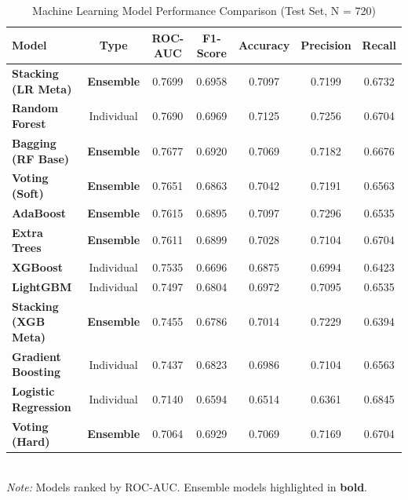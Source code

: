 \begin{table}[htbp]
\centering
\caption{Machine Learning Model Performance Comparison (Test Set, N = 720)}
\label{tab:model-comparison}
\begin{tabular}{lcccccc}
\toprule
\textbf{Model} & \textbf{Type} & \textbf{ROC-AUC} & \textbf{F1-Score} & \textbf{Accuracy} & \textbf{Precision} & \textbf{Recall} \\
\midrule
\textbf{Stacking (LR Meta)} & \textbf{Ensemble} & 0.7699 & 0.6958 & 0.7097 & 0.7199 & 0.6732 \\
\textbf{Random Forest} & Individual & 0.7690 & 0.6969 & 0.7125 & 0.7256 & 0.6704 \\
\textbf{Bagging (RF Base)} & \textbf{Ensemble} & 0.7677 & 0.6920 & 0.7069 & 0.7182 & 0.6676 \\
\textbf{Voting (Soft)} & \textbf{Ensemble} & 0.7651 & 0.6863 & 0.7042 & 0.7191 & 0.6563 \\
\textbf{AdaBoost} & \textbf{Ensemble} & 0.7615 & 0.6895 & 0.7097 & 0.7296 & 0.6535 \\
\textbf{Extra Trees} & \textbf{Ensemble} & 0.7611 & 0.6899 & 0.7028 & 0.7104 & 0.6704 \\
\textbf{XGBoost} & Individual & 0.7535 & 0.6696 & 0.6875 & 0.6994 & 0.6423 \\
\textbf{LightGBM} & Individual & 0.7497 & 0.6804 & 0.6972 & 0.7095 & 0.6535 \\
\textbf{Stacking (XGB Meta)} & \textbf{Ensemble} & 0.7455 & 0.6786 & 0.7014 & 0.7229 & 0.6394 \\
\textbf{Gradient Boosting} & Individual & 0.7437 & 0.6823 & 0.6986 & 0.7104 & 0.6563 \\
\textbf{Logistic Regression} & Individual & 0.7140 & 0.6594 & 0.6514 & 0.6361 & 0.6845 \\
\textbf{Voting (Hard)} & \textbf{Ensemble} & 0.7064 & 0.6929 & 0.7069 & 0.7169 & 0.6704 \\
\bottomrule
\end{tabular}
\smallskip\\
\textit{Note:} Models ranked by ROC-AUC. Ensemble models highlighted in \textbf{bold}.
\end{table}
